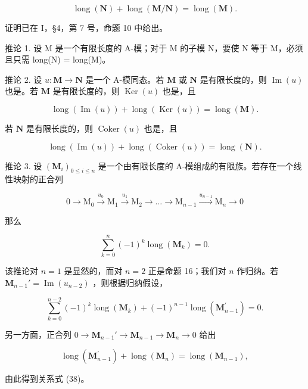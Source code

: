 \[
\operatorname{long} (\mathbf {N}) + \operatorname{long} (\mathbf {M} / \mathbf {N}) = \operatorname{long} (\mathbf {M}).\tag{34}
\]

证明已在 I，§4，第 7 号，命题 10 中给出。

推论 1. 设 M 是一个有限长度的 A-模；对于 M 的子模 N，要使 N 等于 M，必须且只需 long(N) = long(M)。

推论 2. 设 \(u: \mathbf{M} \to \mathbf{N}\) 是一个 A-模同态。若 \(\mathbf{M}\) 或 \(\mathbf{N}\) 是有限长度的，则 \(\operatorname{Im}(u)\) 也是。若 \(\mathbf{M}\) 是有限长度的，则 \(\operatorname{Ker}(u)\) 也是，且

\[
\operatorname{long} (\operatorname{Im} (u)) + \operatorname{long} (\operatorname{Ker} (u)) = \operatorname{long} (\mathbf {M}).\tag{35}
\]

若 \(\mathbf{N}\) 是有限长度的，则 \(\operatorname{Coker}(u)\) 也是，且

\[
\operatorname{long} (\operatorname{Im} (u)) + \operatorname{long} (\operatorname{Coker} (u)) = \operatorname{long} (\mathbf {N}).\tag{36}
\]

推论 3. 设 \((\mathbf{M}_i)_{0\leqslant i\leqslant n}\) 是一个由有限长度的 A-模组成的有限族。若存在一个线性映射的正合列

\[
0 \longrightarrow \mathrm{M} _ {0} \stackrel {u _ {0}} {\longrightarrow} \mathrm{M} _ {1} \stackrel {u _ {1}} {\longrightarrow} \mathrm{M} _ {2} \longrightarrow \dots \longrightarrow \mathrm{M} _ {n - 1} \stackrel {u _ {n - 1}} {\longrightarrow} \mathrm{M} _ {n} \longrightarrow 0\tag{37}
\]

那么

\[
\sum_ {k = 0} ^ {n} (- 1) ^ {k} \operatorname{long} (\mathbf {M} _ {k}) = 0.\tag{38}
\]

该推论对 \(n = 1\) 是显然的，而对 \(n = 2\) 正是命题 16；我们对 \(n\) 作归纳。若 \(\mathbf{M}_{n-1}' = \operatorname{Im}(u_{n-2})\) ，则根据归纳假设，

\[
\sum_ {k = 0} ^ {n - 2} (- 1) ^ {k} \operatorname{long} (\mathbf {M} _ {k}) + (- 1) ^ {n - 1} \operatorname{long} (\mathbf {M} _ {n - 1} ^ {\prime}) = 0.
\]

另一方面，正合列 \(0 \to \mathbf{M}_{n-1}' \to \mathbf{M}_{n-1} \to \mathbf{M}_n \to 0\) 给出

\[
\operatorname{long} \left(\mathbf {M} _ {n - 1} ^ {\prime}\right) + \operatorname{long} \left(\mathbf {M} _ {n}\right) = \operatorname{long} \left(\mathbf {M} _ {n - 1}\right),
\]

由此得到关系式 (38)。

